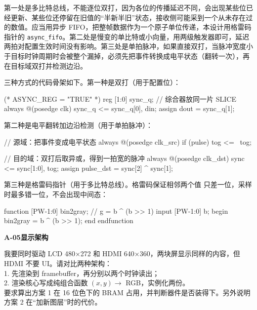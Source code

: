 \documentclass[withoutpreface,bwprint]{cumcmthesis}
\newcommand{\aichat}[2]{%
  \par\vspace{1.0em}%
  \noindent\textbf{\zihao{-4}#1\quad #2}\par
  \vspace{0.6em}%
}
\begin{document}
\begin{tcolorbox}[title=\textbf{AI 回答要点}, colback=green!2!white,
                  colframe=green!30!black, fonttitle=\bfseries, breakable]
第一处是多比特总线，不能逐位双打，因为各位的传播延迟不同，会出现某些位已经更新、某些位还停留在旧值的“半新半旧”状态，接收侧可能采到一个从未存在过的数值。应当用异步 FIFO，把整帧数据作为一个原子单位传递，本设计用格雷码指针的 \texttt{async\_fifo}。第二处是慢变的单比特或小向量，用两级触发器即可，延迟两拍对配置生效时间没有影响。第三处是单拍脉冲，如果直接双打，当脉冲宽度小于目标时钟周期时会被整个漏掉，必须先把事件转换成电平状态（翻转一次），再在目标域双打并检测边沿。

三种方式的代码骨架如下。第一种是双打（用于配置位）：

\begin{ai_verilog}
(* ASYNC_REG = "TRUE" *) reg [1:0] sync_q;   // 综合器放同一片 SLICE
always @(posedge clk) sync_q <= {sync_q[0], din};
assign dout = sync_q[1];
\end{ai_verilog}

第二种是电平翻转加边沿检测（用于单拍脉冲）：

\begin{ai_verilog}
// 源域：把事件变成电平状态
always @(posedge clk_src) if (pulse) tog <= ~tog;

// 目的域：双打后取异或，得到一拍宽的脉冲
always @(posedge clk_dst) sync <= {sync[1:0], tog};
assign pulse_dst = sync[2] ^ sync[1];
\end{ai_verilog}

第三种是格雷码指针（用于多比特总线）。格雷码保证相邻两个值
只差一位，采样时最多错一位，不会出现中间态：

\begin{ai_verilog}
function [PW-1:0] bin2gray;      // g = b ^ (b >> 1)
    input [PW-1:0] b;
    begin bin2gray = b ^ (b >> 1); end
endfunction
\end{ai_verilog}
\end{tcolorbox}


\aichat{A-05}{显示架构}

\begin{tcolorbox}[title=\textbf{用户提示词}, colback=blue!2!white,
                  colframe=blue!30!black, fonttitle=\bfseries, breakable]
我要同时驱动 LCD 480×272 和 HDMI 640×360，两块屏显示同样的内容，但 HDMI 不要 UI。请对比两种架构：\\
1. 先渲染到 framebuffer，再分别以两个时钟读出；\\
2. 渲染核心写成纯组合函数 $(x,y) \rightarrow$ RGB，实例化两份。\\
要求算出方案 1 在 16 位色下的 BRAM 占用，并判断器件是否装得下。另外说明方案 2 在“加新图层”时的代价。
\end{tcolorbox}
\end{document}

